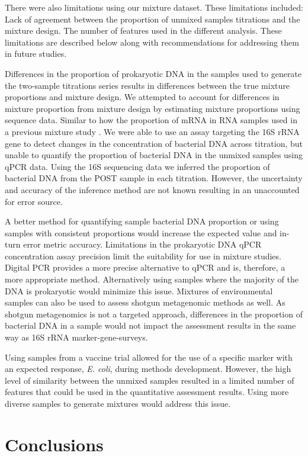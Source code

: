 \documentclass{bmcart}
\begin{document}
There were also limitations using our mixture dataset. These limitations
included: Lack of agreement between the proportion of unmixed samples
titrations and the mixture design. The number of features used in the
different analysis. These limitations are described below along with
recommendations for addressing them in future studies.

Differences in the proportion of prokaryotic DNA in the samples used to
generate the two-sample titrations series results in differences between
the true mixture proportions and mixture design. We attempted to account
for differences in mixture proportion from mixture design by estimating
mixture proportions using sequence data. Similar to how the proportion
of mRNA in RNA samples used in a previous mixture study
\cite{parsons2015using}. We were able to use an assay targeting the
16S rRNA gene to detect changes in the concentration of bacterial DNA
across titration, but unable to quantify the proportion of bacterial DNA
in the unmixed samples using qPCR data. Using the 16S sequencing data we
inferred the proportion of bacterial DNA from the POST sample in each
titration. However, the uncertainty and accuracy of the inference method
are not known resulting in an unaccounted for error source.

A better method for quantifying sample bacterial DNA proportion or using
samples with consistent proportions would increase the expected value
and in-turn error metric accuracy. Limitations in the prokaryotic DNA
qPCR concentration assay precision limit the suitability for use in
mixture studies. Digital PCR provides a more precise alternative to qPCR
and is, therefore, a more appropriate method. Alternatively using
samples where the majority of the DNA is prokaryotic would minimize this
issue. Mixtures of environmental samples can also be used to assess
shotgun metagenomic methods as well. As shotgun metagenomics is not a
targeted approach, differences in the proportion of bacterial DNA in a
sample would not impact the assessment results in the same way as 16S
rRNA marker-gene-surveys.

Using samples from a vaccine trial allowed for the use of a specific
marker with an expected response, \emph{E. coli}, during methods
development. However, the high level of similarity between the unmixed
samples resulted in a limited number of features that could be used in
the quantitative assessment results. Using more diverse samples to
generate mixtures would address this issue.


\section*{Conclusions}
\end{document}
